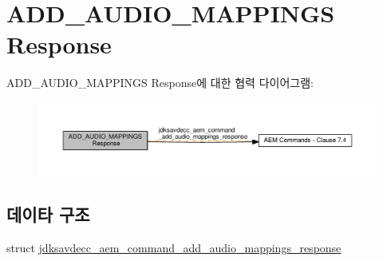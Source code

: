 \hypertarget{group__command__add__audio__mappings__response}{}\section{A\+D\+D\+\_\+\+A\+U\+D\+I\+O\+\_\+\+M\+A\+P\+P\+I\+N\+GS Response}
\label{group__command__add__audio__mappings__response}
A\+D\+D\+\_\+\+A\+U\+D\+I\+O\+\_\+\+M\+A\+P\+P\+I\+N\+GS Response에 대한 협력 다이어그램\+:
\nopagebreak
\begin{figure}[H]
\begin{center}
\leavevmode
\includegraphics[width=350pt]{group__command__add__audio__mappings__response}
\end{center}
\end{figure}
\subsection*{데이타 구조}
\begin{DoxyCompactItemize}
\item 
struct \hyperlink{structjdksavdecc__aem__command__add__audio__mappings__response}{jdksavdecc\+\_\+aem\+\_\+command\+\_\+add\+\_\+audio\+\_\+mappings\+\_\+response}
\end{DoxyCompactItemize}
